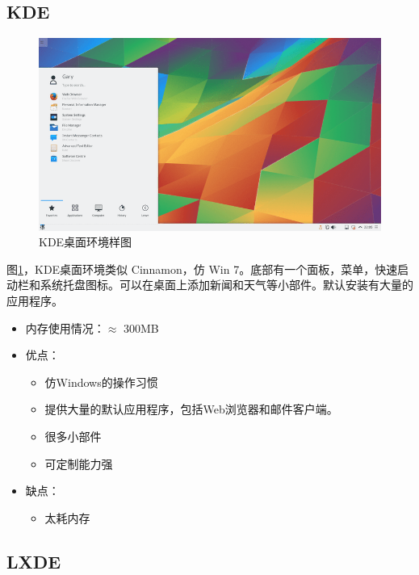 \documentclass[doctor,openright,twoside]{sjtuthesis}
\providecommand{\tightlist}{%
    \setlength{\itemsep}{0pt}\setlength{\parskip}{0pt}}
\theoremstyle{plain}
\theoremstyle{definition}
\theoremstyle{remark}
\theoremstyle{ocrenumbox}
\theoremstyle{plain}
\begin{document}
\hypertarget{kde}{%
\subsection{KDE}\label{kde}}

\begin{figure}
\includegraphics{de-KDE} \caption[KDE桌面环境样图]{KDE桌面环境样图}\label{fig:de-KDE}
\end{figure}

图\ref{fig:de-KDE}，KDE桌面环境类似 Cinnamon，仿 Win
7。底部有一个面板，菜单，快速启动栏和系统托盘图标。可以在桌面上添加新闻和天气等小部件。默认安装有大量的应用程序。

\begin{itemize}
\tightlist
\item
  内存使用情况：\(\approx\) 300MB
\item
  优点：

  \begin{itemize}
  \tightlist
  \item
    仿Windows的操作习惯
  \item
    提供大量的默认应用程序，包括Web浏览器和邮件客户端。
  \item
    很多小部件
  \item
    可定制能力强
  \end{itemize}
\item
  缺点：

  \begin{itemize}
  \tightlist
  \item
    太耗内存
  \end{itemize}
\end{itemize}

\hypertarget{lxde}{%
\subsection{LXDE}\label{lxde}}
\end{document}
